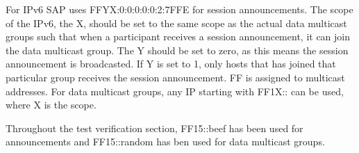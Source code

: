\noindent{}For IPv6 SAP uses FFYX:0:0:0:0:0:2:7FFE for session announcements. The scope of the IPv6, the X, should be set to the same scope as the actual data multicast groups such that when a participant receives a session announcement, it can join the data multicast group. The Y should be set to zero, as this means the session announcement is broadcasted. If Y is set to 1, only hosts that has joined that particular group receives the session announcement. FF is assigned to multicast addresses. For data multicast groups, any IP starting with FF1X:: can be used, where X is the scope.

\noindent{}Throughout the test verification section, FF15::beef has been used for announcements and FF15::random has ben used for data multicast groups.



%





%

